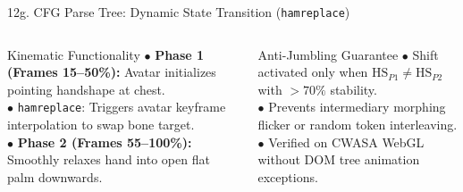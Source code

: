\documentclass[aspectratio=169,xcolor={table,dvipsnames}]{beamer}
\begin{document}
\begin{frame}[t]{12g. CFG Parse Tree: Dynamic State Transition (\texttt{hamreplace})}
\vspace{0.8mm}

\vspace{1.2mm}
\begin{columns}[T]
    \begin{block}{Kinematic Functionality}
        \fontsize{5.4pt}{6.8pt}\selectfont
        $\bullet$ \textbf{Phase 1 (Frames 15--50\%):} Avatar initializes pointing handshape at chest.\\
        $\bullet$ \texttt{hamreplace}: Triggers avatar keyframe interpolation to swap bone target.\\
        $\bullet$ \textbf{Phase 2 (Frames 55--100\%):} Smoothly relaxes hand into open flat palm downwards.
    \end{block}

    \begin{block}{Anti-Jumbling Guarantee}
        \fontsize{5.4pt}{6.8pt}\selectfont
        $\bullet$ Shift activated only when $\text{HS}_{P1} \neq \text{HS}_{P2}$ with $>70\%$ stability.\\
        $\bullet$ Prevents intermediary morphing flicker or random token interleaving.\\
        $\bullet$ Verified on CWASA WebGL without DOM tree animation exceptions.
    \end{block}
\end{columns}
\end{frame}
\end{document}

